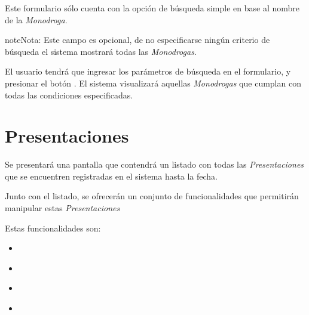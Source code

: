 \documentclass[a4paper,10pt,spanish]{sphinxmanual}
\begin{document}

Este formulario sólo cuenta con la opción de búsqueda simple en base al nombre de la \emph{Monodroga}.

\begin{notice}{note}{Nota:}
Este campo es opcional, de no especificarse ningún criterio de búsqueda el sistema mostrará todas las \emph{Monodrogas}.
\end{notice}

El usuario tendrá que ingresar los parámetros de búsqueda en el formulario, y presionar el botón . El sistema visualizará aquellas \emph{Monodrogas} que cumplan con todas las condiciones especificadas.


\section{Presentaciones}
\label{presentaciones::doc}\label{presentaciones:presentaciones}
Se presentará una pantalla que contendrá un listado con todas las \emph{Presentaciones} que se encuentren registradas en el sistema hasta la fecha.


Junto con el listado, se ofrecerán un conjunto de funcionalidades que permitirán manipular estas \emph{Presentaciones}

Estas funcionalidades son:
\begin{itemize}
\item {} 
{\hyperref[presentaciones:alta\string-presentacion]{}}

\item {} 
{\hyperref[presentaciones:modificar\string-presentacion]{}}

\item {} 
{\hyperref[presentaciones:eliminar\string-presentacion]{}}

\item {} 
{\hyperref[presentaciones:formulario\string-busqueda\string-presentacion]{}}

\end{itemize}
\end{document}
